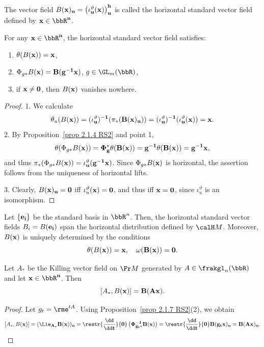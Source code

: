 \begin{defn}
    The vector field $B(\bf{x})_u=\left(\iota_u^\vartheta(\bf{x})\right)_u^h$ is called the horizontal standard vector field defined by $\bf{x}\in\bbR^n$.
\end{defn}

\begin{prop}[{{\cite[Prop.~2.1.7]{RS2}}}]\label{prop 2.1.7 RS2}
    For any $\bf{x}\in\bbR^n$, the horizontal standard vector field satisfies:
    \begin{enumerate}
        \item $\theta(B(\bf{x}))=\bf{x}$,
        \item $\Phi_{g\ast}B(\bf{x})=B(g^{-1}\bf{x})$, $g\in\GL_m(\bbR)$,
        \item if $\bf{x}\neq 0$, then $B(\bf{x})$ vanishes nowhere.
    \end{enumerate}
\end{prop}
\begin{proof}
    1. We calculate
    \[\theta_u(B(\bf{x}))=(\iota_u^\vartheta)^{-1}(\pi_\ast(B(\bf{x})_u))=(\iota_u^\vartheta)^{-1}(\iota_u^\vartheta(\bf{x}))=\bf{x}.\]
    2. By Proposition~\ref{prop 2.1.4 RS2} and point 1, 
    \[\theta(\Phi_{g\ast}B(\bf{x}))=\Phi_g^\ast \theta(B(\bf{x}))=g^{-1}\theta(B(\bf{x}))=g^{-1}\bf{x},\]
    and thus $\pi_\ast(\Phi_{g\ast}B(\bf{x}))=\iota_u^\vartheta(g^{-1}\bf{x})$. Since $\Phi_{g\ast}B(\bf{x})$ is horizontal, the assertion follows from the uniqueness of horizontal lifts.

    3. Clearly, $B(\bf{x})_u=0$ iff $\iota_u^\vartheta(\bf{x})=0$, and thus iff $\bf{x}=0$, since $\iota_u^\vartheta$ is an isomorphism.
\end{proof}

\begin{rem}\label{rem 2.1.8 RS2}
    Let $\{\bf{e}_i\}$ be the standard basis in $\bbR^n$. Then, the horizontal standard vector fields $B_i=B(\bf{e}_i)$ span the horizontal distribution defined by $\calH M$. Moreover, $B(\bf{x})$ is uniquely determined by the conditions
    \[\theta(B(\bf{x}))=\bf{x},\quad \omega(B(\bf{x}))=0.\]
\end{rem}


\begin{lem}[{{\cite[Lem.~2.1.9]{RS2}}}]\label{lem 2.1.9 RS2}
    Let $A_\ast$ be the Killing vector field on $\Fr M$ generated by $A\in\frakgl_n(\bbR)$ and let $\bf{x}\in\bbR^n$. Then
    \[[A_\ast,B(\bf{x})]=B(A\bf{x}).\]
\end{lem}
\begin{proof}
    Let $g_t=\rme^{tA}$. Using Proposition~\ref{prop 2.1.7 RS2}(2), we obtain
    \[[A_\ast,B(\bf{x})]=(\Lie_{A_\ast}B(\bf{x}))_u=\restr{\frac{\dd}{\dd t}}{0}\left(\Phi_{g_t\ast}^{-1}B(\bf{x})\right)= \restr{\frac{\dd}{\dd t}}{0} B(g_t\bf{x})_u=B(A\bf{x})_u.\]
\end{proof}

